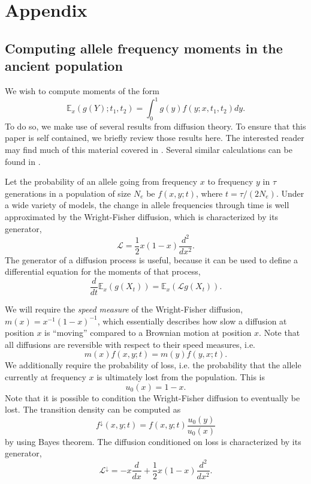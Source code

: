 \documentclass[11pt, oneside]{article}   	%
\begin{document}
\section{Appendix}
\subsection{Computing allele frequency moments in the ancient population}
We wish to compute moments of the form
\begin{equation}
\mathbb{E}_x(g(Y); t_1, t_2) = \int_0^1 g(y) f(y; x, t_1, t_2)dy.
\label{cond_exp}
\end{equation}
To do so, we make use of several results from diffusion theory. To ensure that this paper is self contained, we briefly review those results here. The interested reader may find much of this material covered in \citet{ewens2012mathematical, karlin1981second}. Several similar calculations can be found in \citet{griffiths2003frequency}.

Let the probability of an allele going from frequency $x$ to frequency $y$ in $\tau$ generations in a population of size $N_e$ be $f(x,y; t)$, where $t = \tau/(2N_e)$. Under a wide variety of models, the change in allele frequencies through time is well approximated by the Wright-Fisher diffusion, which is characterized by its generator,
\[
\mathcal{L} = \frac{1}{2}x(1-x)\frac{d^2}{dx^2}.
\]
The generator of a diffusion process is useful, because it can be used to define a differential equation for the moments of that process,
\begin{equation}
\frac{d}{dt}\mathbb{E}_x(g(X_t)) = \mathbb{E}_x \left( \mathcal{L} g(X_t) \right).
\label{expectation_ode}
\end{equation}

We will require the \emph{speed measure} of the Wright-Fisher diffusion, $m(x) = x^{-1}(1-x)^{-1}$, which essentially describes how slow a diffusion at position $x$ is ``moving'' compared to a Brownian motion at position $x$. Note that all diffusions are reversible with respect to their speed measures, i.e.
\[
m(x)f(x,y;t) = m(y)f(y,x;t).
\]
We additionally require the probability of loss, i.e. the probability that the allele currently at frequency $x$ is ultimately lost from the population. This is
\[
u_0(x) = 1-x.
\]
Note that it is possible to condition the Wright-Fisher diffusion to eventually be lost. The transition density can be computed as
\[
f^{\downarrow}(x,y;t) = f(x,y;t)\frac{u_0(y)}{u_0(x)}
\]
by using Bayes theorem. The diffusion conditioned on loss is characterized by its generator,
\[
\mathcal{L}^\downarrow = -x\frac{d}{dx} + \frac{1}{2}x(1-x)\frac{d^2}{dx^2}.
\]
\end{document}
